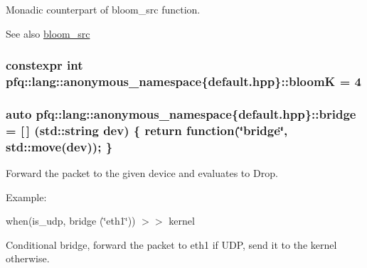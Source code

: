Monadic counterpart of {\ttfamily bloom\+\_\+src} function. 

\begin{DoxySeeAlso}{See also}
\hyperlink{namespacepfq_1_1lang_1_1anonymous__namespace_02default_8hpp_03_aa2a8ff506d61e93d8eca4419513970f4}{bloom\+\_\+src} 
\end{DoxySeeAlso}
\subsubsection[{\texorpdfstring{bloomK}{bloomK}}]{\setlength{\rightskip}{0pt plus 5cm}constexpr int pfq\+::lang\+::anonymous\+\_\+namespace\{default.\+hpp\}\+::bloomK = 4}\hypertarget{namespacepfq_1_1lang_1_1anonymous__namespace_02default_8hpp_03_a56750cdea1537acfa24c256b64924004}{}\label{namespacepfq_1_1lang_1_1anonymous__namespace_02default_8hpp_03_a56750cdea1537acfa24c256b64924004}
\subsubsection[{\texorpdfstring{bridge}{bridge}}]{\setlength{\rightskip}{0pt plus 5cm}auto pfq\+::lang\+::anonymous\+\_\+namespace\{default.\+hpp\}\+::bridge = \mbox{[}$\,$\mbox{]} (std\+::string dev) \{ return {\bf function}(\char`\"{}bridge\char`\"{}, std\+::move(dev)); \}}\hypertarget{namespacepfq_1_1lang_1_1anonymous__namespace_02default_8hpp_03_ad318dd8fb6441b78bdfb056173e5a7e2}{}\label{namespacepfq_1_1lang_1_1anonymous__namespace_02default_8hpp_03_ad318dd8fb6441b78bdfb056173e5a7e2}


Forward the packet to the given device and evaluates to {\ttfamily Drop}. 

Example\+:

when(is\+\_\+udp, bridge (\char`\"{}eth1\char`\"{})) $>$$>$ kernel

Conditional bridge, forward the packet to eth1 if U\+DP, send it to the kernel otherwise. 
